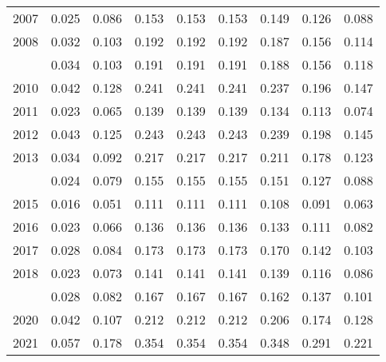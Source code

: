 \documentclass[
]{article}
\begin{document}
\begin{longtable}[t]{lrrrrrrrr}
2007 & 0.025 & 0.086 & 0.153 & 0.153 & 0.153 & 0.149 & 0.126 & 0.088\\
2008 & 0.032 & 0.103 & 0.192 & 0.192 & 0.192 & 0.187 & 0.156 & 0.114\\
\addlinespace
2009 & 0.034 & 0.103 & 0.191 & 0.191 & 0.191 & 0.188 & 0.156 & 0.118\\
2010 & 0.042 & 0.128 & 0.241 & 0.241 & 0.241 & 0.237 & 0.196 & 0.147\\
2011 & 0.023 & 0.065 & 0.139 & 0.139 & 0.139 & 0.134 & 0.113 & 0.074\\
2012 & 0.043 & 0.125 & 0.243 & 0.243 & 0.243 & 0.239 & 0.198 & 0.145\\
2013 & 0.034 & 0.092 & 0.217 & 0.217 & 0.217 & 0.211 & 0.178 & 0.123\\
\addlinespace
2014 & 0.024 & 0.079 & 0.155 & 0.155 & 0.155 & 0.151 & 0.127 & 0.088\\
2015 & 0.016 & 0.051 & 0.111 & 0.111 & 0.111 & 0.108 & 0.091 & 0.063\\
2016 & 0.023 & 0.066 & 0.136 & 0.136 & 0.136 & 0.133 & 0.111 & 0.082\\
2017 & 0.028 & 0.084 & 0.173 & 0.173 & 0.173 & 0.170 & 0.142 & 0.103\\
2018 & 0.023 & 0.073 & 0.141 & 0.141 & 0.141 & 0.139 & 0.116 & 0.086\\
\addlinespace
2019 & 0.028 & 0.082 & 0.167 & 0.167 & 0.167 & 0.162 & 0.137 & 0.101\\
2020 & 0.042 & 0.107 & 0.212 & 0.212 & 0.212 & 0.206 & 0.174 & 0.128\\
2021 & 0.057 & 0.178 & 0.354 & 0.354 & 0.354 & 0.348 & 0.291 & 0.221\\*
\end{longtable}
\end{document}
